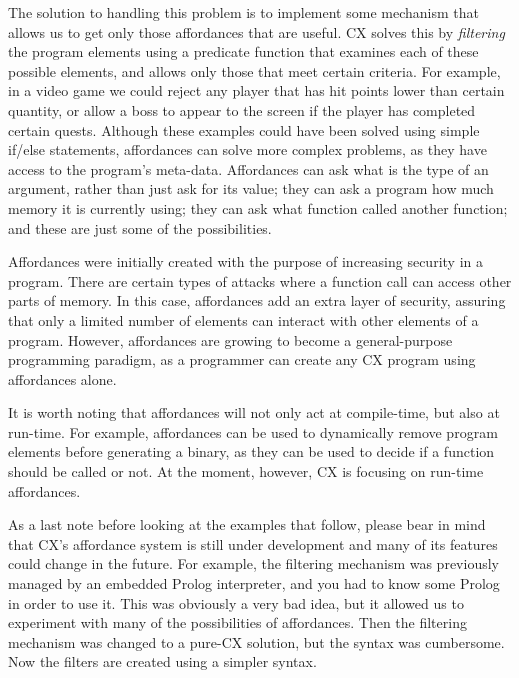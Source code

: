 \documentclass[11pt,fleqn,openany]{book} %
\begin{document}
The solution to handling this problem is to implement some mechanism that allows us to get only those affordances that are useful. CX solves this by \emph{filtering} the program elements using a predicate function that examines each of these possible elements, and allows only those that meet certain criteria. For example, in a video game we could reject any player that has hit points lower than certain quantity, or allow a boss to appear to the screen if the player has completed certain quests. Although these examples could have been solved using simple if/else statements, affordances can solve more complex problems, as they have access to the program's meta-data. Affordances can ask what is the type of an argument, rather than just ask for its value; they can ask a program how much memory it is currently using; they can ask what function called another function; and these are just some of the possibilities.

Affordances were initially created with the purpose of increasing security in a program. There are certain types of attacks where a function call can access other parts of memory. In this case, affordances add an extra layer of security, assuring that only a limited number of elements can interact with other elements of a program. However, affordances are growing to become a general-purpose programming paradigm, as a programmer can create any CX program using affordances alone.

It is worth noting that affordances will not only act at compile-time, but also at run-time. For example, affordances can be used to dynamically remove program elements before generating a binary, as they can be used to decide if a function should be called or not. At the moment, however, CX is focusing on run-time affordances.

As a last note before looking at the examples that follow, please bear in mind that CX's affordance system is still under development and many of its features could change in the future. For example, the filtering mechanism was previously managed by an embedded Prolog interpreter, and you had to know some Prolog in order to use it. This was obviously a very bad idea, but it allowed us to experiment with many of the possibilities of affordances. Then the filtering mechanism was changed to a pure-CX solution, but the syntax was cumbersome. Now the filters are created using a simpler syntax.
\end{document}
